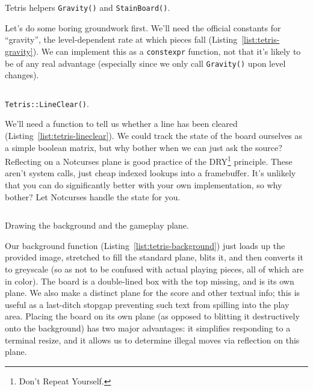 \pagebreak

\begin{listing}[!htb]
\inputminted[]{C}{code-tetris/gravity.h}
\inputminted[]{C}{code-tetris/stain.h}
\caption{Tetris helpers \texttt{Gravity()} and \texttt{StainBoard()}.}
\label{list:tetris-gravity}
\end{listing}

Let's do some boring groundwork first. We'll need the official constants for
``gravity'', the level-dependent rate at which pieces fall
(Listing~\ref{list:tetris-gravity}). We can implement this as a
\texttt{constexpr} function, not that it's likely to be of any real
advantage (especially since we only call \texttt{Gravity()} upon level changes).

\begin{listing}[!htb]
\inputminted[]{C}{code-tetris/clear.h}
\caption{\texttt{Tetris::LineClear()}.}
\label{list:tetris-lineclear}
\end{listing}

We'll need a function to tell us whether a line has been cleared
(Listing~\ref{list:tetris-lineclear}). We could track the state of the board
ourselves as a simple boolean matrix, but why bother when we can just ask the
source? Reflecting on a Notcurses plane is good practice of the
DRY\footnote{Don't Repeat Yourself.} principle. These aren't system calls,
just cheap indexed lookups into a framebuffer. It's unlikely that you can
do significantly better with your own implementation, so why bother? Let
Notcurses handle the state for you.

\begin{listing}[!htb]
\inputminted[]{C}{code-tetris/background.h}
\caption{Drawing the background and the gameplay plane.}
\label{list:tetris-background}
\end{listing}

Our background function (Listing~\ref{list:tetris-background}) just loads up
the provided image, stretched to fill the standard plane, blits it, and then
converts it to greyscale (so as not to be confused with actual playing pieces,
all of which are in color). The board is a double-lined box with the top
missing, and is its own plane. We also make a distinct plane for the score
and other textual info; this is useful as a last-ditch stopgap preventing
such text from spilling into the play area. Placing the board on its own
plane (as opposed to blitting it destructively onto the background) has two
major advantages: it simplifies responding to a terminal resize, and it allows
us to determine illegal moves via reflection on this plane.

